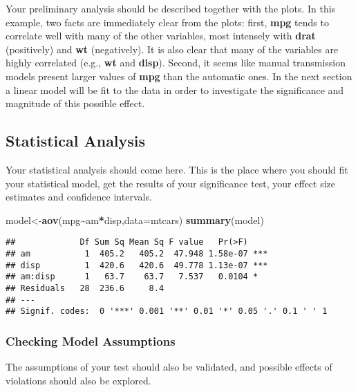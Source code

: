 \documentclass[
]{article}
\newenvironment{Shaded}{\begin{snugshade}}{\end{snugshade}}
\newcommand{\AttributeTok}[1]{\textcolor[rgb]{0.13,0.29,0.53}{#1}}
\newcommand{\FunctionTok}[1]{\textcolor[rgb]{0.13,0.29,0.53}{\textbf{#1}}}
\newcommand{\NormalTok}[1]{#1}
\newcommand{\OtherTok}[1]{\textcolor[rgb]{0.56,0.35,0.01}{#1}}
\newcommand{\SpecialCharTok}[1]{\textcolor[rgb]{0.81,0.36,0.00}{\textbf{#1}}}
\begin{document}
Your preliminary analysis should be described together with the plots.
In this example, two facts are immediately clear from the plots: first,
\textbf{mpg} tends to correlate well with many of the other variables,
most intensely with \textbf{drat} (positively) and \textbf{wt}
(negatively). It is also clear that many of the variables are highly
correlated (e.g., \textbf{wt} and \textbf{disp}). Second, it seems like
manual transmission models present larger values of \textbf{mpg} than
the automatic ones. In the next section a linear model will be fit to
the data in order to investigate the significance and magnitude of this
possible effect.

\subsection{Statistical Analysis}\label{statistical-analysis}

Your statistical analysis should come here. This is the place where you
should fit your statistical model, get the results of your significance
test, your effect size estimates and confidence intervals.

\begin{Shaded}
\begin{Highlighting}[]
\NormalTok{model}\OtherTok{\textless{}{-}}\FunctionTok{aov}\NormalTok{(mpg}\SpecialCharTok{\textasciitilde{}}\NormalTok{am}\SpecialCharTok{*}\NormalTok{disp,}\AttributeTok{data=}\NormalTok{mtcars)}
\FunctionTok{summary}\NormalTok{(model)}
\end{Highlighting}
\end{Shaded}

\begin{verbatim}
##             Df Sum Sq Mean Sq F value   Pr(>F)    
## am           1  405.2   405.2  47.948 1.58e-07 ***
## disp         1  420.6   420.6  49.778 1.13e-07 ***
## am:disp      1   63.7    63.7   7.537   0.0104 *  
## Residuals   28  236.6     8.4                     
## ---
## Signif. codes:  0 '***' 0.001 '**' 0.01 '*' 0.05 '.' 0.1 ' ' 1
\end{verbatim}

\subsubsection{Checking Model
Assumptions}\label{checking-model-assumptions}

The assumptions of your test should also be validated, and possible
effects of violations should also be explored.
\end{document}
